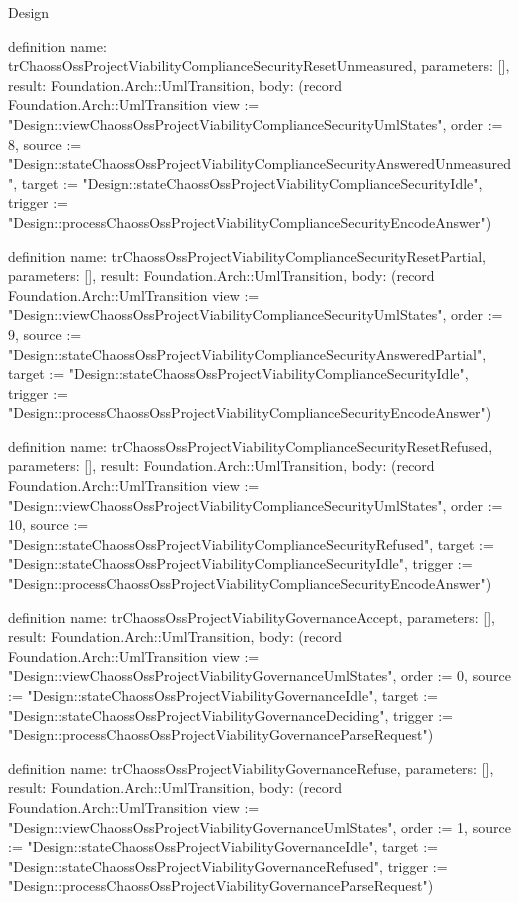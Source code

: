 \begin{lexlean}{Design}
\begin{semanticmodule}
definition{
  name: trChaossOssProjectViabilityComplianceSecurityResetUnmeasured,
  parameters: [],
  result: Foundation.Arch::UmlTransition,
  body: (record Foundation.Arch::UmlTransition {view := "Design::viewChaossOssProjectViabilityComplianceSecurityUmlStates", order := 8, source := "Design::stateChaossOssProjectViabilityComplianceSecurityAnsweredUnmeasured", target := "Design::stateChaossOssProjectViabilityComplianceSecurityIdle", trigger := "Design::processChaossOssProjectViabilityComplianceSecurityEncodeAnswer"})
}

definition{
  name: trChaossOssProjectViabilityComplianceSecurityResetPartial,
  parameters: [],
  result: Foundation.Arch::UmlTransition,
  body: (record Foundation.Arch::UmlTransition {view := "Design::viewChaossOssProjectViabilityComplianceSecurityUmlStates", order := 9, source := "Design::stateChaossOssProjectViabilityComplianceSecurityAnsweredPartial", target := "Design::stateChaossOssProjectViabilityComplianceSecurityIdle", trigger := "Design::processChaossOssProjectViabilityComplianceSecurityEncodeAnswer"})
}

definition{
  name: trChaossOssProjectViabilityComplianceSecurityResetRefused,
  parameters: [],
  result: Foundation.Arch::UmlTransition,
  body: (record Foundation.Arch::UmlTransition {view := "Design::viewChaossOssProjectViabilityComplianceSecurityUmlStates", order := 10, source := "Design::stateChaossOssProjectViabilityComplianceSecurityRefused", target := "Design::stateChaossOssProjectViabilityComplianceSecurityIdle", trigger := "Design::processChaossOssProjectViabilityComplianceSecurityEncodeAnswer"})
}

definition{
  name: trChaossOssProjectViabilityGovernanceAccept,
  parameters: [],
  result: Foundation.Arch::UmlTransition,
  body: (record Foundation.Arch::UmlTransition {view := "Design::viewChaossOssProjectViabilityGovernanceUmlStates", order := 0, source := "Design::stateChaossOssProjectViabilityGovernanceIdle", target := "Design::stateChaossOssProjectViabilityGovernanceDeciding", trigger := "Design::processChaossOssProjectViabilityGovernanceParseRequest"})
}

definition{
  name: trChaossOssProjectViabilityGovernanceRefuse,
  parameters: [],
  result: Foundation.Arch::UmlTransition,
  body: (record Foundation.Arch::UmlTransition {view := "Design::viewChaossOssProjectViabilityGovernanceUmlStates", order := 1, source := "Design::stateChaossOssProjectViabilityGovernanceIdle", target := "Design::stateChaossOssProjectViabilityGovernanceRefused", trigger := "Design::processChaossOssProjectViabilityGovernanceParseRequest"})
}


\end{semanticmodule}
\end{lexlean}
